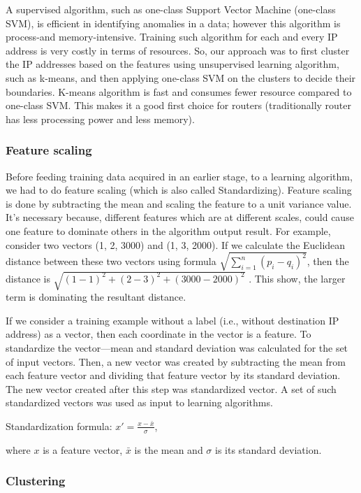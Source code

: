 \documentclass[12pt,oneside,a4paper]{article}
\begin{document}
A supervised algorithm, such as one-class Support Vector Machine (one-class SVM)\cite{svm}, is efficient in identifying anomalies in a data; however this algorithm is process-and memory-intensive. Training such algorithm for each and every IP address is very costly in terms of resources. So, our approach was to first cluster the IP addresses based on the features using unsupervised learning algorithm, such as k-means, and then applying one-class SVM on the clusters to decide their boundaries. K-means algorithm is fast and consumes fewer resource compared to one-class SVM. This makes it a good first choice for routers (traditionally router has less processing power and less memory).

\subsubsection{Feature scaling}

Before feeding training data acquired in an earlier stage, to a learning algorithm, we had to do feature scaling (which is also called Standardizing). Feature scaling is done by subtracting the mean and scaling the feature to a unit variance value. It's necessary because, different features which are at different scales, could cause one feature to dominate others in the algorithm output result. For example, consider two vectors (1, 2, 3000) and (1, 3, 2000). If we calculate the Euclidean distance between these two vectors using formula $\sqrt{\sum_{i=1}^n (p_i - q_i)^2}$, then the distance is $\sqrt{(1-1)^2 + (2-3)^2 + (3000-2000)^2}$ . This show, the larger term is dominating the resultant distance.

If we consider a training example without a label (i.e., without destination IP address) as a vector, then each coordinate in the vector is a feature. To standardize the vector---mean and standard deviation was calculated for the set of input vectors. Then, a new vector was created by subtracting the mean from each feature vector and dividing that feature vector by its standard deviation. The new vector created after this step was standardized vector. A set of such standardized vectors was used as input to learning algorithms.

\hspace{2cm} Standardization formula: $x' = \frac{x - \bar{x}}{\sigma}$,

where $x$ is a feature vector, ${\bar{x}}$ is the mean and $\sigma$  is its standard deviation.

\subsubsection{Clustering} \label{subsec:Clustering}
\end{document}
